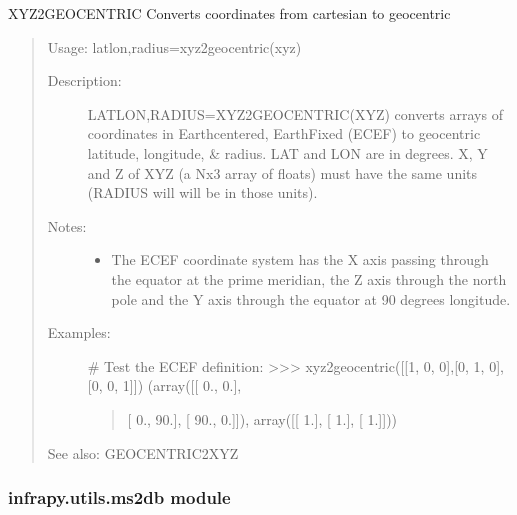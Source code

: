 \documentclass[letterpaper,10pt,english]{sphinxmanual}
\begin{document}

\begin{fulllineitems}
\label{\detokenize{infrapy.utils:infrapy.utils.latlon.xyz2geocentric}}
XYZ2GEOCENTRIC    Converts coordinates from cartesian to geocentric
\begin{quote}

Usage:    latlon,radius=xyz2geocentric(xyz)
\begin{description}
\item[{Description:}] \leavevmode
LATLON,RADIUS=XYZ2GEOCENTRIC(XYZ) converts arrays of coordinates in
Earth\sphinxhyphen{}centered, Earth\sphinxhyphen{}Fixed (ECEF) to geocentric latitude, longitude, \&
radius.  LAT and LON are in degrees.  X, Y and Z of XYZ (a Nx3 array of
floats) must have the same units (RADIUS will will be in those units).

\item[{Notes:}] \leavevmode\begin{itemize}
\item {} 
The ECEF coordinate system has the X axis passing through the equator
at the prime meridian, the Z axis through the north pole and the Y
axis through the equator at 90 degrees longitude.

\end{itemize}

\item[{Examples:}] \leavevmode
\# Test the ECEF definition:
\textgreater{}\textgreater{}\textgreater{} xyz2geocentric({[}{[}1, 0, 0{]},{[}0, 1, 0{]},{[}0, 0, 1{]}{]})
(array({[}{[}  0.,   0.{]},
\begin{quote}

{[}  0.,  90.{]},
{[} 90.,   0.{]}{]}), array({[}{[} 1.{]},
{[} 1.{]},
{[} 1.{]}{]}))
\end{quote}

\end{description}

See also: GEOCENTRIC2XYZ
\end{quote}

\end{fulllineitems}



\subsubsection{infrapy.utils.ms2db module}
\label{\detokenize{infrapy.utils:module-infrapy.utils.ms2db}}\label{\detokenize{infrapy.utils:infrapy-utils-ms2db-module}}
\end{document}
